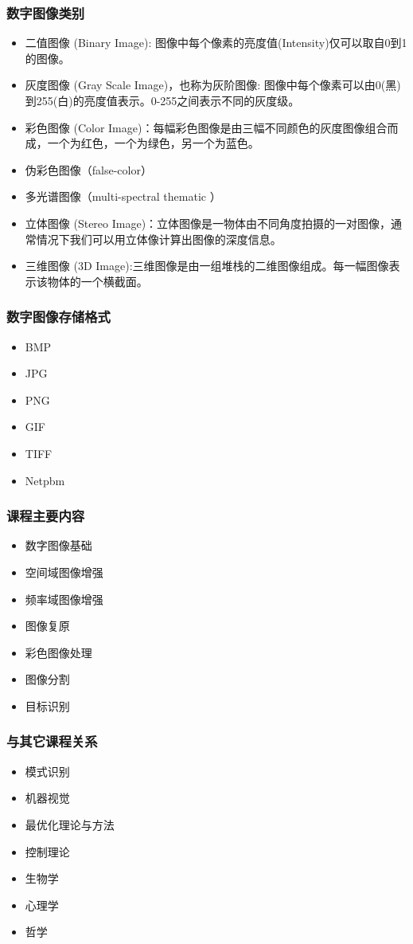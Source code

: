 \documentclass{beamer}
\begin{document}
\begin{frame}
\frametitle{数字图像类别}
\label{sec-1-4}

\begin{itemize}
\item 二值图像 (Binary Image): 图像中每个像素的亮度值(Intensity)仅可以取自0到1的图像。
\item 灰度图像 (Gray Scale Image)，也称为灰阶图像: 图像中每个像素可以由0(黑)到255(白)的亮度值表示。0-255之间表示不同的灰度级。
\item 彩色图像 (Color Image)：每幅彩色图像是由三幅不同颜色的灰度图像组合而成，一个为红色，一个为绿色，另一个为蓝色。
\item 伪彩色图像（false-color）
\item 多光谱图像（multi-spectral thematic ）
\item 立体图像 (Stereo Image)：立体图像是一物体由不同角度拍摄的一对图像，通常情况下我们可以用立体像计算出图像的深度信息。
\item 三维图像 (3D Image):三维图像是由一组堆栈的二维图像组成。每一幅图像表示该物体的一个横截面。
\end{itemize}
\end{frame}
\begin{frame}
\frametitle{数字图像存储格式}
\label{sec-1-5}

\begin{itemize}
\item BMP
\item JPG
\item PNG
\item GIF
\item TIFF
\item Netpbm
\end{itemize}
\end{frame}
\begin{frame}
\frametitle{课程主要内容}
\label{sec-1-6}


\begin{itemize}
\item 数字图像基础
\item 空间域图像增强
\item 频率域图像增强
\item 图像复原
\item 彩色图像处理
\item 图像分割
\item 目标识别
\end{itemize}
\end{frame}
\begin{frame}
\frametitle{与其它课程关系}
\label{sec-1-7}


\begin{itemize}
\item 模式识别
\item 机器视觉
\item 最优化理论与方法
\item 控制理论
\item 生物学
\item 心理学
\item 哲学
\end{itemize}
\end{frame}
\end{document}
